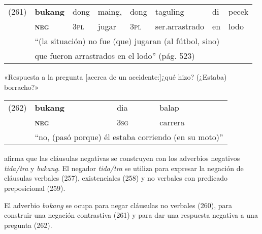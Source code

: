 {%
\noindent \begin{tabular}{llllllll}
(261) & \textbf{bukang} & dong & maing, & dong & taguling & di & pecek \\
& \textsc{\textbf{neg}} & \textsc{3pl} & jugar & \textsc{3pl} & ser.arrastrado & en & lodo \\
& \multicolumn{7}{l}{``(la situación) no fue (que) jugaran (al fútbol, sino)} \\ & \multicolumn{7}{l}{que fueron arrastrados en el lodo'' (pág. 523)}
\end{tabular} \vspace{0.5cm}

\noindent «Respuesta a la pregunta [acerca de un accidente:]¿qué hizo? (¿Estaba) borracho?»

\noindent \begin{tabular}{llll}
(262) & \textbf{bukang} & dia & balap \\
& \textsc{\textbf{neg}} & \textsc{3sg} & carrera \\
& \multicolumn{3}{l}{``no, (pasó porque) él estaba corriendo (en su moto)''}
\end{tabular} \vspace{0.5cm}

}

\textcolor{MidnightBlue}{\citet{papuan}} afirma que las cláusulas negativas se construyen con los adverbios negativos {\setmainfont{Charis SIL} \textit{tida/tra}} y {\setmainfont{Charis SIL} \textit{bukang}}. El negador {\setmainfont{Charis SIL} \textit{tida/tra}} se utiliza para expresar la negación de cláusulas verbales (257), existenciales (258) y no verbales con predicado preposicional (259). 

El adverbio {\setmainfont{Charis SIL} \textit{bukang}} se ocupa para negar cláusulas no verbales (260), para construir una negación contrastiva (261) y para dar una respuesta negativa a una pregunta (262).